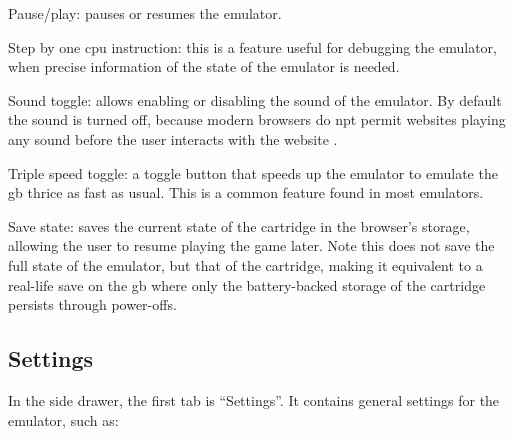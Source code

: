 \documentclass[11pt]{informatics-report}
\begin{document}
\begin{compactitem}
    \item Pause/play: pauses or resumes the emulator.
    \item Step by one \gls{cpu} instruction: this is a feature useful for debugging the emulator, when precise information of the state of the emulator is needed.
    \item Sound toggle: allows enabling or disabling the sound of the emulator. By default the sound is turned off, because modern browsers do npt permit websites playing any sound before the user interacts with the website \cite{browser_autoplay}.
    \item Triple speed toggle: a toggle button that speeds up the emulator to emulate the \gls{gb} thrice as fast as usual. This is a common feature found in most emulators.
    \item Save state: saves the current state of the cartridge in the browser's storage, allowing the user to resume playing the game later. Note this does not save the full state of the emulator, but that of the cartridge, making it equivalent to a real-life save on the \gls{gb} where only the battery-backed storage of the cartridge persists through power-offs.
\end{compactitem}

\subsection{Settings}
\label{sec:settings-ui}

In the side drawer, the first tab is ``Settings''. It contains general settings for the emulator, such as:
\end{document}
